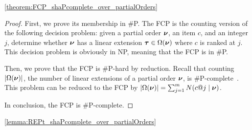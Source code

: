 \begin{reptheorem}{\ref{theorem:FCP_shaPcomplete_over_partialOrders}}
    \theoremFCPhardnessOverPartialOrders
\end{reptheorem}

\begin{proof}
    First, we prove its membership in \#P.
    The FCP is the counting version of the following decision problem: given a partial order $\bm{\nu}$, an item $c$, and an integer $j$, determine whether $\bm{\nu}$ has a linear extension $\bm{\tau} \in \Omega(\bm{\nu})$ where $c$ is ranked at $j$.
    This decision problem is obviously in NP, meaning that the FCP is in \#P.
    
    Then, we prove that the FCP is \#P-hard by reduction.
    Recall that counting $|\Omega(\bm{\nu})|$, the number of linear extensions of a partial order $\bm{\nu}$, is \#P-complete~\cite{DBLP:conf/stoc/BrightwellW91}.
    This problem can be reduced to the FCP by $|\Omega(\bm{\nu})| = \sum_{j=1}^{m}{N(c@j \mid \bm{\nu})}$.
    
    In conclusion, the FCP is \#P-complete.
\end{proof}

\begin{replemma}{\ref{lemma:REPt_shaPcomplete_over_partialOrders}}
    \lemmaREPtHardnessOverPartialOrders
\end{replemma}

